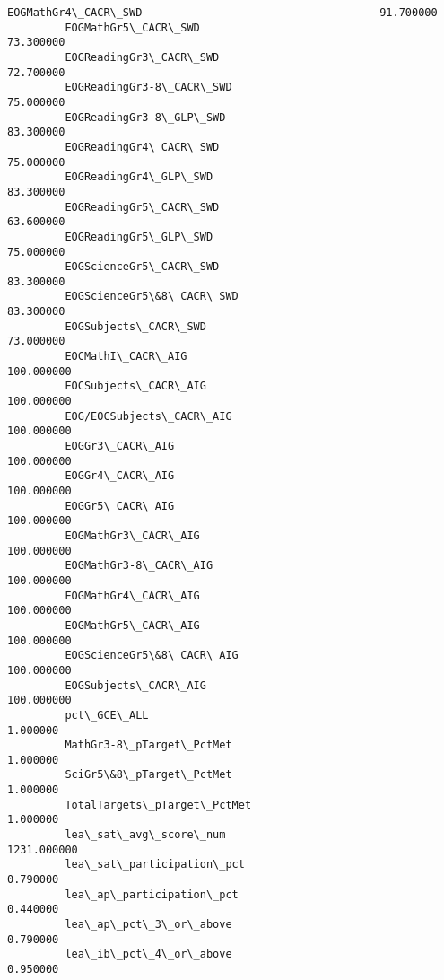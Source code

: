\documentclass[11pt]{article}
\begin{document}
\begin{Verbatim}[commandchars=\\\{\}]
         EOGMathGr4\_CACR\_SWD                                     91.700000  
         EOGMathGr5\_CACR\_SWD                                     73.300000  
         EOGReadingGr3\_CACR\_SWD                                  72.700000  
         EOGReadingGr3-8\_CACR\_SWD                                75.000000  
         EOGReadingGr3-8\_GLP\_SWD                                 83.300000  
         EOGReadingGr4\_CACR\_SWD                                  75.000000  
         EOGReadingGr4\_GLP\_SWD                                   83.300000  
         EOGReadingGr5\_CACR\_SWD                                  63.600000  
         EOGReadingGr5\_GLP\_SWD                                   75.000000  
         EOGScienceGr5\_CACR\_SWD                                  83.300000  
         EOGScienceGr5\&8\_CACR\_SWD                                83.300000  
         EOGSubjects\_CACR\_SWD                                    73.000000  
         EOCMathI\_CACR\_AIG                                      100.000000  
         EOCSubjects\_CACR\_AIG                                   100.000000  
         EOG/EOCSubjects\_CACR\_AIG                               100.000000  
         EOGGr3\_CACR\_AIG                                        100.000000  
         EOGGr4\_CACR\_AIG                                        100.000000  
         EOGGr5\_CACR\_AIG                                        100.000000  
         EOGMathGr3\_CACR\_AIG                                    100.000000  
         EOGMathGr3-8\_CACR\_AIG                                  100.000000  
         EOGMathGr4\_CACR\_AIG                                    100.000000  
         EOGMathGr5\_CACR\_AIG                                    100.000000  
         EOGScienceGr5\&8\_CACR\_AIG                               100.000000  
         EOGSubjects\_CACR\_AIG                                   100.000000  
         pct\_GCE\_ALL                                              1.000000  
         MathGr3-8\_pTarget\_PctMet                                 1.000000  
         SciGr5\&8\_pTarget\_PctMet                                  1.000000  
         TotalTargets\_pTarget\_PctMet                              1.000000  
         lea\_sat\_avg\_score\_num                                 1231.000000  
         lea\_sat\_participation\_pct                                0.790000  
         lea\_ap\_participation\_pct                                 0.440000  
         lea\_ap\_pct\_3\_or\_above                                    0.790000  
         lea\_ib\_pct\_4\_or\_above                                    0.950000  

\end{Verbatim}
\end{document}
